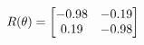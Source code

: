 \documentclass[preview]{standalone}
\begin{document}
\begin{align*}
\special{dvisvgm:raw <g id='unique000'>}R(\theta) = \begin{bmatrix}-0.98 & -0.19\\0.19 & -0.98\end{bmatrix}\special{dvisvgm:raw </g>}
\end{align*}
\end{document}
